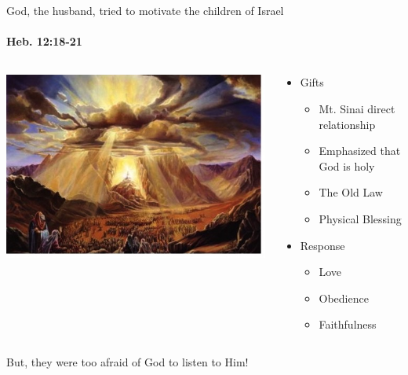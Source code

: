 \begin{frame}{God, the husband, tried to motivate the children of Israel}
\framesubtitle{Heb. 12:18-21}
\begin{columns}[c]
\begin{column}{0.5\textwidth}
	\includegraphics[width=\columnwidth]{figures/mountSinai2.jpg}
\end{column}
\begin{column}{0.5\textwidth}
	\begin{itemize}
		\item Gifts
		\begin{itemize}
			\item Mt. Sinai direct relationship
      \item Emphasized that God is holy
      \item The Old Law
      \item Physical Blessing
		\end{itemize}
		\item Response
    \begin{itemize}
		  \item Love
			\item Obedience
			\item Faithfulness
    \end{itemize}
	\end{itemize}
\end{column}
\end{columns}
\begin{center}
But, they were too afraid of God to listen to Him!
\end{center}
\end{frame}

